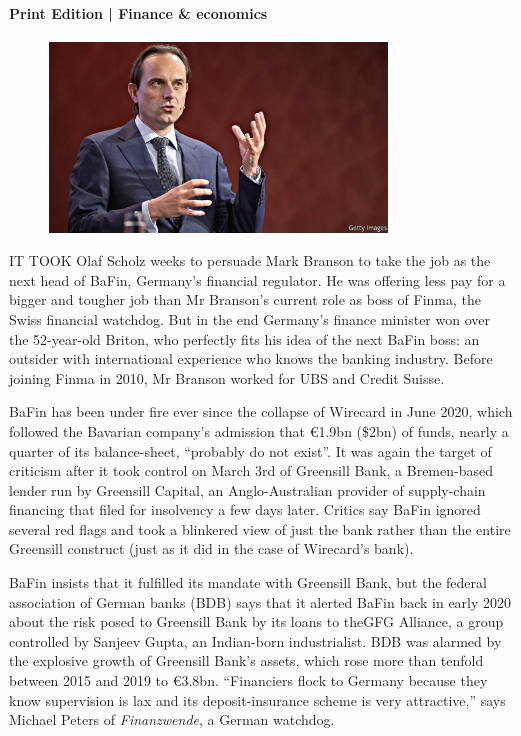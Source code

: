 \documentclass{article}
\begin{document}
\paragraph{Print Edition | Finance \& economics  \quad \color{gray}{Mar 27th 2021 }}
\begin{figure}[h]
\centering
\includegraphics[width=0.8\textwidth]{images/20210327_fnp505.jpg}
\end{figure}
\lettrine{I}T TOOK Olaf Scholz weeks to persuade Mark Branson to take the job as the next head of BaFin, Germany's financial regulator. He was offering less pay for a bigger and tougher job than Mr Branson's current role as boss of Finma, the Swiss financial watchdog. But in the end Germany's finance minister won over the 52-year-old Briton, who perfectly fits his idea of the next BaFin boss: an outsider with international experience who knows the banking industry. Before joining Finma in 2010, Mr Branson worked for UBS and Credit Suisse. 

BaFin has been under fire ever since the collapse of Wirecard in June 2020, which followed the Bavarian company's admission that €1.9bn (\$2bn) of funds, nearly a quarter of its balance-sheet, ``probably do not exist''. It was again the target of criticism after it took control on March 3rd of Greensill Bank, a Bremen-based lender run by Greensill Capital, an Anglo-Australian provider of supply-chain financing that filed for insolvency a few days later. Critics say BaFin ignored several red flags and took a blinkered view of just the bank rather than the entire Greensill construct (just as it did in the case of Wirecard's bank). 

BaFin insists that it fulfilled its mandate with Greensill Bank, but the federal association of German banks (BDB) says that it alerted BaFin back in early 2020 about the risk posed to Greensill Bank by its loans to theGFG Alliance, a group controlled by Sanjeev Gupta, an Indian-born industrialist. BDB was alarmed by the explosive growth of Greensill Bank's assets, which rose more than tenfold between 2015 and 2019 to €3.8bn. ``Financiers flock to Germany because they know supervision is lax and its deposit-insurance scheme is very attractive,'' says Michael Peters of \emph{Finanzwende}, a German watchdog. 
\end{document}
